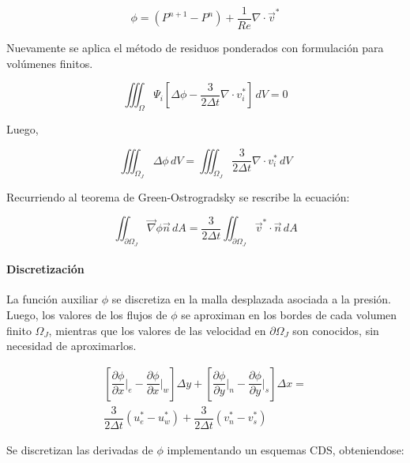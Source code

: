 \begin{equation}
\phi = \left( P^{n+1} - P^n \right) + \dfrac{1}{Re} \nabla \cdot \vec{v}^* 
\end{equation}

Nuevamente se aplica el método de residuos ponderados con formulación para volúmenes finitos.

\begin{equation}
\iiint_{\Omega} \Psi_i  \left[ \Delta \phi - \dfrac{3}{2 \Delta t} \nabla \cdot v_i^* \right] \, dV = 0
\end{equation}

Luego,

\begin{equation}
\iiint_{\Omega_J} \Delta \phi \, dV = \iiint_{\Omega_J} \dfrac{3}{2 \Delta t} \nabla \cdot v_i^* \, dV
\end{equation}

Recurriendo al teorema de Green-Ostrogradsky se rescribe la ecuación:

\begin{equation}
\iint_{\partial \Omega_J} \vec{\nabla} \phi \vec{n} \, dA = \dfrac{3}{2 \Delta t} \iint_{\partial \Omega_J} \vec{v}^* \cdot \vec{n} \, dA
\end{equation}

\paragraph{Discretización} La función auxiliar $\phi$ se discretiza en la malla desplazada asociada a la presión. Luego, los valores de los flujos de $\phi$ se aproximan en los bordes de cada volumen finito $\Omega_J$, mientras que los valores de las velocidad en $\partial \Omega_J$ son conocidos, sin necesidad de aproximarlos.

\begin{equation}
\begin{split}
\left[ \dfrac{\partial \phi}{\partial x} \Big|_e - \dfrac{\partial \phi}{\partial x} \Big|_w \right] \Delta y + \left[ \dfrac{\partial \phi}{\partial y} \Big|_n - \dfrac{\partial \phi}{\partial y} \Big|_s \right] \Delta x = \\ \dfrac{3}{2 \Delta t} \left( u^*_e - u_w^*  \right) + \dfrac{3}{2 \Delta t} \left( v^*_n - v_s^*  \right)
\end{split}
\end{equation}

Se discretizan las derivadas de $\phi$ implementando un esquemas CDS, obteniendose:

